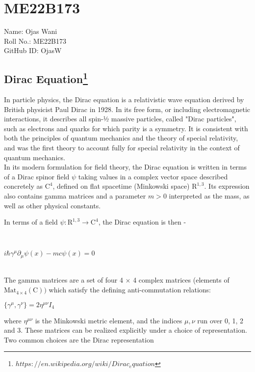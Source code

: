 \section{ME22B173}

Name: Ojas Wani\\
Roll No.: ME22B173\\
GitHub ID: OjasW


\subsection{Dirac Equation\protect\footnote{${https://en.wikipedia.org/wiki/Dirac_equation}$}}

In particle physics, the Dirac equation is a relativistic wave equation derived by British physicist Paul Dirac in 1928. In its free form, or including electromagnetic interactions, it describes all spin-1⁄2 massive particles, called "Dirac particles", such as electrons and quarks for which parity is a symmetry. It is consistent with both the principles of quantum mechanics and the theory of special relativity, and was the first theory to account fully for special relativity in the context of quantum mechanics. \\
In its modern formulation for field theory, the Dirac equation is written in terms of a Dirac spinor field $\psi$  taking values in a complex vector space described concretely as ${\displaystyle \mathrm {C} ^{4}}$, defined on flat spacetime (Minkowski space) ${\displaystyle \mathrm {R} ^{1,3}}$. Its expression also contains gamma matrices and a parameter $m > 0$ interpreted as the mass, as well as other physical constants. \newline
\\
\centerline{In terms of a field ${\displaystyle \psi :\mathrm {R} ^{1,3}\rightarrow \mathrm {C} ^{4}}$, the Dirac equation is then -} \\ \centerline{${\displaystyle i\hbar \gamma ^{\mu }\partial _{\mu }\psi (x)-mc\psi (x)=0}$} \newline
\\
The gamma matrices are a set of four 4 $\times$ 4 complex matrices (elements of ${\displaystyle {\text{Mat}}_{4\times 4}(\mathrm {C} )})$ which satisfy the defining anti-commutation relations:

\centerline{${\displaystyle \{\gamma ^{\mu },\gamma ^{\nu }\}=2\eta ^{\mu \nu }I_{4}}$} 
where $\eta ^{\mu \nu }$ is the Minkowski metric element, and the indices $\mu, \nu$ run over 0, 1, 2 and 3. These matrices can be realized explicitly under a choice of representation. Two common choices are the Dirac representation

